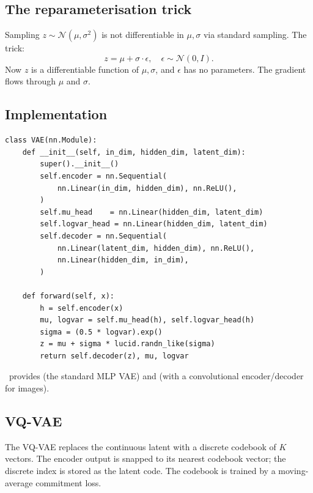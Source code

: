 \subsection{The reparameterisation trick}
\label{ssec:generative:reparam}

Sampling $z \sim \mathcal{N}(\mu, \sigma^2)$ is not
differentiable in $\mu, \sigma$ via standard sampling. The trick:
\[
  z = \mu + \sigma \cdot \epsilon, \quad \epsilon \sim \mathcal{N}(0, I).
\]
Now $z$ is a differentiable function of $\mu, \sigma$, and
$\epsilon$ has no parameters. The gradient flows through $\mu$
and $\sigma$.

\subsection{Implementation}
\label{ssec:generative:vae_impl}

\begin{lstlisting}[style=lucid,language=LucidPython]
class VAE(nn.Module):
    def __init__(self, in_dim, hidden_dim, latent_dim):
        super().__init__()
        self.encoder = nn.Sequential(
            nn.Linear(in_dim, hidden_dim), nn.ReLU(),
        )
        self.mu_head    = nn.Linear(hidden_dim, latent_dim)
        self.logvar_head = nn.Linear(hidden_dim, latent_dim)
        self.decoder = nn.Sequential(
            nn.Linear(latent_dim, hidden_dim), nn.ReLU(),
            nn.Linear(hidden_dim, in_dim),
        )

    def forward(self, x):
        h = self.encoder(x)
        mu, logvar = self.mu_head(h), self.logvar_head(h)
        sigma = (0.5 * logvar).exp()
        z = mu + sigma * lucid.randn_like(sigma)
        return self.decoder(z), mu, logvar
\end{lstlisting}

\Lucid\ provides  (the standard MLP VAE) and
 (with a convolutional encoder/decoder for
images).

\subsection{VQ-VAE}
\label{ssec:generative:vqvae}

The VQ-VAE \cite{vandenoord_vqvae_2017} replaces the
continuous latent with a discrete codebook of $K$ vectors. The
encoder output is snapped to its nearest codebook vector; the
discrete index is stored as the latent code. The codebook is
trained by a moving-average commitment loss.

